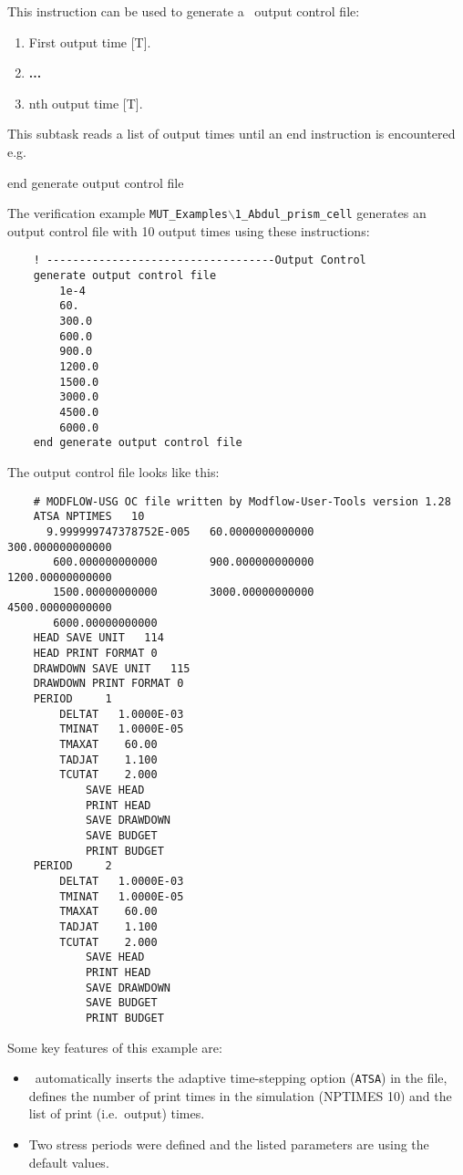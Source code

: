 \label{section:OutputControl}
This instruction can be used to generate a \mfus\ output control file:

    {
    \squish
    \begin{enumerate}
    \item {}  First output time [T].
    \item \textbf{...}
    \item {}  nth output time [T].
    \end{enumerate}

          This subtask reads a list of output times  until an \textsf{end} instruction is encountered e.g.\:

    {\Large \sf end generate output control file}
    }
    
The verification example \texttt{MUT\_Examples$\backslash$1\_Abdul\_prism\_cell} generates an output control file with 10 output times using these instructions:
\begin{verbatim}
    ! -----------------------------------Output Control
    generate output control file
        1e-4
        60.
        300.0
        600.0
        900.0
        1200.0
        1500.0
        3000.0
        4500.0
        6000.0
    end generate output control file
\end{verbatim}
    
The output control file looks like this:
\begin{verbatim}
    # MODFLOW-USG OC file written by Modflow-User-Tools version 1.28
    ATSA NPTIMES   10
      9.999999747378752E-005   60.0000000000000        300.000000000000
       600.000000000000        900.000000000000        1200.00000000000
       1500.00000000000        3000.00000000000        4500.00000000000
       6000.00000000000
    HEAD SAVE UNIT   114
    HEAD PRINT FORMAT 0
    DRAWDOWN SAVE UNIT   115
    DRAWDOWN PRINT FORMAT 0
    PERIOD     1
        DELTAT   1.0000E-03
        TMINAT   1.0000E-05
        TMAXAT    60.00
        TADJAT    1.100
        TCUTAT    2.000
            SAVE HEAD
            PRINT HEAD
            SAVE DRAWDOWN
            SAVE BUDGET
            PRINT BUDGET
    PERIOD     2
        DELTAT   1.0000E-03
        TMINAT   1.0000E-05
        TMAXAT    60.00
        TADJAT    1.100
        TCUTAT    2.000
            SAVE HEAD
            PRINT HEAD
            SAVE DRAWDOWN
            SAVE BUDGET
            PRINT BUDGET
\end{verbatim}

Some key features of this example are:
\begin{itemize}
    \item \mut\ automatically inserts  the  adaptive time-stepping option (\texttt{ATSA}) in the file, defines the number of print times in the simulation (NPTIMES 10) and the list of print (i.e.\ output) times.
    \item Two stress periods were defined and the listed parameters are using the default values.
\end{itemize}

